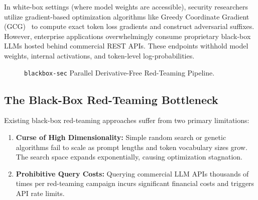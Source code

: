 \documentclass[11pt,a4paper]{article}
\begin{document}
In white-box settings (where model weights are accessible), security researchers utilize gradient-based optimization algorithms like Greedy Coordinate Gradient (GCG)~\cite{gcg_attack} to compute exact token loss gradients and construct adversarial suffixes. However, enterprise applications overwhelmingly consume proprietary black-box LLMs hosted behind commercial REST APIs. These endpoints withhold model weights, internal activations, and token-level log-probabilities.

\begin{figure}[h!]
\centering
{}
\caption{\texttt{blackbox-sec} Parallel Derivative-Free Red-Teaming Pipeline.}
\label{fig:blackbox_pipeline}
\end{figure}

\subsection{The Black-Box Red-Teaming Bottleneck}
Existing black-box red-teaming approaches suffer from two primary limitations:
\begin{enumerate}
    \item \textbf{Curse of High Dimensionality:} Simple random search or genetic algorithms fail to scale as prompt lengths and token vocabulary sizes grow. The search space expands exponentially, causing optimization stagnation.
    \item \textbf{Prohibitive Query Costs:} Querying commercial LLM APIs thousands of times per red-teaming campaign incurs significant financial costs and triggers API rate limits.
\end{enumerate}
\end{document}
